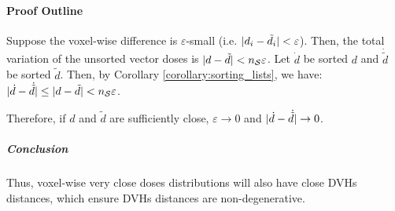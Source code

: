 \paragraph{Proof Outline}
Suppose the voxel-wise difference is $\varepsilon$-small (i.e. $|{d_i-\tilde{d}_i}| < \varepsilon$).
Then, the total variation of the unsorted vector doses is $|{d-\tilde{d}}| < n_\mathcal{S} \varepsilon$.
Let $\dot{d}$ be sorted $d$ and $\dot{\tilde{d}}$ be sorted $\tilde{d}$.
Then, by Corollary \ref{corollary:sorting_lists}, we have:
$|{\dot{d}-\dot{\tilde{d}}}| \leq |{d-\tilde{d}}| < n_\mathcal{S} \varepsilon$.

Therefore, if $d$ and $\tilde{d}$ are sufficiently close, $\varepsilon \to 0$ and $|{\dot{d}-\dot{\tilde{d}}}| \to 0$.

\subparagraph{Conclusion}
Thus, voxel-wise very close doses distributions will also have close DVHs distances, which ensure DVHs distances are non-degenerative.

